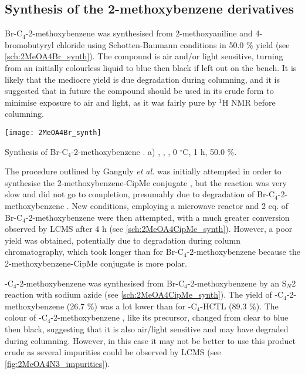 
\subsection{Synthesis of the 2-methoxybenzene derivatives\label{sec:2MeO}}

Br-C$_4$-2-methoxybenzene  was synthesised from 2-methoxyaniline  and 4-bromobutyryl chloride  using Schotten-Baumann conditions in 50.0 \% yield (see \ref{sch:2MeOA4Br_synth}). The compound is air and/or light sensitive, turning from an initially colourless liquid to blue then black if left out on the bench. It is likely that the mediocre yield is due degradation during columning, and it is suggested that in future the compound should be used in its crude form to minimise exposure to air and light, as it was fairly pure by $^{1}$H NMR before columning.

\begin{scheme}[H]
	\begin{center}
		\texttt{[image: 2MeOA4Br\_synth]}
		\caption{Synthesis of Br-C$_4$-2-methoxybenzene .
		a) , , , 0 $^{\circ}$C, 1 h, 50.0 \%.
		\label{sch:2MeOA4Br_synth}}
	\end{center}
\end{scheme}

The procedure outlined by Ganguly \textit{et al.}\cite{Ganguly2011} was initially attempted in order to synthesise the 2-methoxybenzene-CipMe conjugate , but the reaction was very slow and did not go to completion, presumably due to degradation of Br-C$_4$-2-methoxybenzene .
New conditions, employing a microwave reactor and 2 eq. of Br-C$_4$-2-methoxybenzene  were then attempted, with a much greater conversion observed by LCMS after 4 h (see \ref{sch:2MeOA4CipMe_synth}). However, a poor yield was obtained, potentially due to degradation during column chromatography, which took longer than for Br-C$_4$-2-methoxybenzene  because the 2-methoxybenzene-CipMe conjugate  is more polar.

-C$_4$-2-methoxybenzene  was synthesised from Br-C$_4$-2-methoxybenzene  by an S$_N$2 reaction with sodium azide (see \ref{sch:2MeOA4CipMe_synth}). The yield of -C$_4$-2-methoxybenzene  (26.7 \%) was a lot lower than for -C$_4$-HCTL  (89.3 \%). The colour of -C$_4$-2-methoxybenzene , like its precursor, changed from clear to blue then black, suggesting that it is also air/light sensitive and may have degraded during columning. However, in this case it may not be better to use this product crude as several impurities could be observed by LCMS (see \ref{fig:2MeOA4N3_impurities}).

